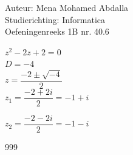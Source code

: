 \documentclass[a4paper]{article}
\begin{document}
\noindent \large Auteur: Mena Mohamed Abdalla \\
\noindent \large Studierichting:  Informatica\\
\noindent \large Oefeningenreeks 1B nr. 40.6\\

\medskip

\normalsize

$z^2-2z+2=0 $\\

$D=-4$\\

$z=\dfrac{-2 \pm \sqrt{-4 }}{2}$\\

$z_1=\dfrac{-2 + 2i}{2} = -1 + i $

$z_2=\dfrac{-2 - 2i}{2}=-1 - i$




\begin{thebibliography}{999}
\end{thebibliography}
\end{document}
